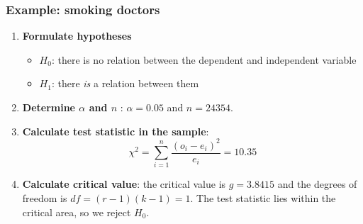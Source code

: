 \documentclass{beamer}
\begin{document}
\begin{frame}
  \frametitle{Example: smoking doctors}
  \begin{enumerate}
  \item \textbf{Formulate hypotheses}
    \begin{itemize}
      \item $H_{0}$: there is no relation between the dependent and independent variable
      \item $H_{1}$: there \emph{is} a relation between them
    \end{itemize}
  \item \textbf{Determine $\alpha$ and $n$} : $\alpha = 0.05$ and $n = 24354$.
  \item \textbf{Calculate test statistic in the sample}:
  \[ \chi^{2} = \sum_{i=1}^{n} \frac{(o_{i} - e_{i})^{2}}{e_{i}} = 10.35 \]
  \item \textbf{Calculate critical value}: the critical value is $g = 3.8415$ and the degrees of freedom is $df = (r-1)(k-1) = 1$. The test statistic lies within the critical area, so we reject $H_{0}$.
\end{enumerate}
\end{frame}
\end{document}
